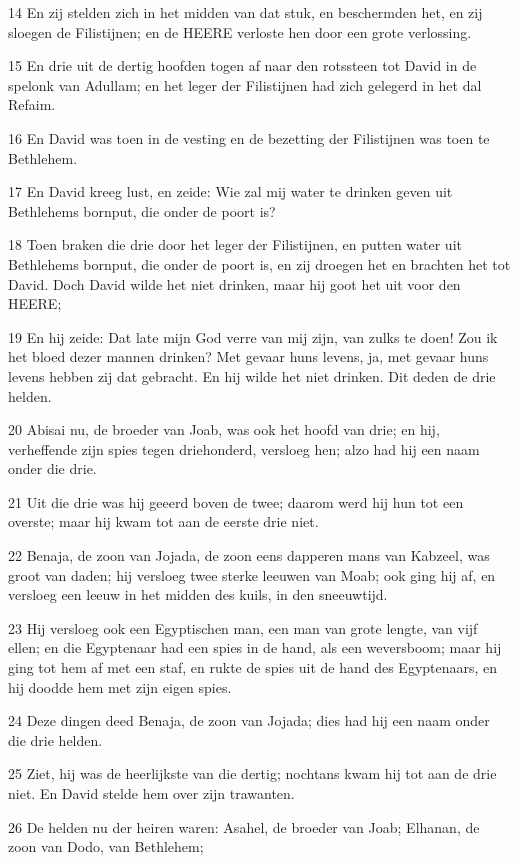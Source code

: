 \par 14 En zij stelden zich in het midden van dat stuk, en beschermden het, en zij sloegen de Filistijnen; en de HEERE verloste hen door een grote verlossing.
\par 15 En drie uit de dertig hoofden togen af naar den rotssteen tot David in de spelonk van Adullam; en het leger der Filistijnen had zich gelegerd in het dal Refaim.
\par 16 En David was toen in de vesting en de bezetting der Filistijnen was toen te Bethlehem.
\par 17 En David kreeg lust, en zeide: Wie zal mij water te drinken geven uit Bethlehems bornput, die onder de poort is?
\par 18 Toen braken die drie door het leger der Filistijnen, en putten water uit Bethlehems bornput, die onder de poort is, en zij droegen het en brachten het tot David. Doch David wilde het niet drinken, maar hij goot het uit voor den HEERE;
\par 19 En hij zeide: Dat late mijn God verre van mij zijn, van zulks te doen! Zou ik het bloed dezer mannen drinken? Met gevaar huns levens, ja, met gevaar huns levens hebben zij dat gebracht. En hij wilde het niet drinken. Dit deden de drie helden.
\par 20 Abisai nu, de broeder van Joab, was ook het hoofd van drie; en hij, verheffende zijn spies tegen driehonderd, versloeg hen; alzo had hij een naam onder die drie.
\par 21 Uit die drie was hij geeerd boven de twee; daarom werd hij hun tot een overste; maar hij kwam tot aan de eerste drie niet.
\par 22 Benaja, de zoon van Jojada, de zoon eens dapperen mans van Kabzeel, was groot van daden; hij versloeg twee sterke leeuwen van Moab; ook ging hij af, en versloeg een leeuw in het midden des kuils, in den sneeuwtijd.
\par 23 Hij versloeg ook een Egyptischen man, een man van grote lengte, van vijf ellen; en die Egyptenaar had een spies in de hand, als een weversboom; maar hij ging tot hem af met een staf, en rukte de spies uit de hand des Egyptenaars, en hij doodde hem met zijn eigen spies.
\par 24 Deze dingen deed Benaja, de zoon van Jojada; dies had hij een naam onder die drie helden.
\par 25 Ziet, hij was de heerlijkste van die dertig; nochtans kwam hij tot aan de drie niet. En David stelde hem over zijn trawanten.
\par 26 De helden nu der heiren waren: Asahel, de broeder van Joab; Elhanan, de zoon van Dodo, van Bethlehem;
